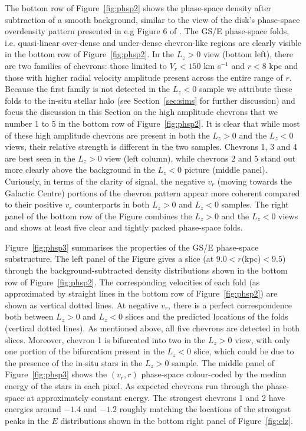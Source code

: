 \documentclass[a4paper,useAMS,usenatbib]{mnras}
\begin{document}
The bottom row of Figure~\ref{fig:phsp2} shows the phase-space density after subtraction of a smooth background, similar to the view of the disk's phase-space overdensity pattern presented in e.g Figure 6 of \citet{Laporte2019}. The GS/E phase-space folds, i.e. quasi-linear over-dense and under-dense chevron-like regions are clearly visible in the bottom row of Figure~\ref{fig:phsp2}.  In the $L_z>0$ view (bottom left), there are two families of chevrons: those limited to $V_r<150$ km s$^{-1}$ and $r<8$ kpc and those with higher radial velocity amplitude present across the entire range of $r$. Because the first family is not detected in the $L_z<0$ sample we attribute these folds to the in-situ stellar halo (see Section~\ref{sec:sims} for further discussion) and focus the discussion in this Section on the high amplitude chevrons that we number 1 to 5 in the bottom row of Figure~\ref{fig:phsp2}. It is clear that while most of these high amplitude chevrons are present in both the $L_z>0$ and the $L_z<0$ views, their relative strength is different in the two samples. Chevrons 1, 3 and 4 are best seen in the $L_z>0$ view (left column), while chevrons 2 and 5 stand out more clearly above the background in the $L_z<0$ picture (middle panel). Curiously, in terms of the clarity of signal, the negative $v_r$ (moving towards the Galactic Centre) portions of the chevron pattern appear more coherent compared to their positive $v_r$ counterparts in both $L_z>0$ and $L_z<0$ samples. The right panel of the bottom row of the Figure combines the $L_z>0$ and the $L_z<0$ views and shows at least five clear and tightly packed phase-space folds.

Figure~\ref{fig:phsp3} summarises the properties of the GS/E phase-space substructure. The left panel of the Figure gives a slice (at $9.0<r$(kpc)$<9.5$) through the background-subtracted density distributions shown in the bottom row of Figure~\ref{fig:phsp2}. The corresponding velocities of each fold (as approximated by straight lines in the bottom row of Figure~\ref{fig:phsp2}) are shown as vertical dotted lines. At negative $v_r$, there is a perfect correspondence both between $L_z>0$ and $L_z<0$ slices and the predicted locations of the folds (vertical dotted lines). As mentioned above, all five chevrons are detected in both slices. Moreover, chevron 1 is bifurcated into two in the $L_z>0$ view, with only one portion of the bifurcation present in the $L_z<0$ slice, which could be due to the presence of the in-situ stars in the $L_z>0$ sample. The middle panel of Figure~\ref{fig:phsp3} shows the  $(v_r, r)$  phase-space colour-coded by the median energy of the stars in each pixel. As expected chevrons run through the phase-space at approximately constant energy. The strongest chevrons 1 and 2 have energies around $-1.4$ and $-1.2$ roughly matching the locations of the strongest peaks in the $E$ distributions shown in the bottom right panel of Figure~\ref{fig:elz}.
\end{document}
